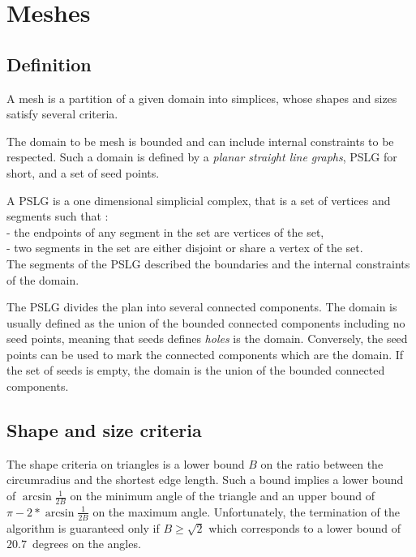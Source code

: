 
\section{Meshes}
\label{sec:Mesh_2_meshes}


\subsection{Definition}
\label{sec:Mesh_2_meshes_definition}

A mesh is a partition of a given domain into simplices, whose shapes
and sizes satisfy several criteria.

The domain to be mesh is bounded and can include internal constraints
to be respected.  Such a domain is defined by a \emph{planar straight
  line graphs}, PSLG for short, and a set of seed points.

A PSLG is a one dimensional simplicial complex, that
is a set of vertices and segments such that : \\
- the endpoints of any segment in the set are vertices of the set, \\
- two segments in the set are either disjoint or share a vertex of the 
set. \\
The segments of the PSLG described the boundaries and the internal
constraints of the domain.

The PSLG divides the plan into several connected components.  The domain is
usually defined as the union of the bounded connected components including
no seed points, meaning that seeds defines \emph{holes} is the domain.
Conversely, the seed points can be used to mark the connected components
which are  the domain.  If the set of seeds is empty,
the domain is the union of the bounded connected components.

\subsection{Shape and size criteria}
\label{sec:Mesh_2_criteria}

The shape criteria on triangles is a lower bound $B$ on the ratio
between the circumradius and the shortest edge length.  Such a bound
implies a lower bound of $\arcsin{\frac{1}{2B}}$ on the minimum angle
of the triangle and an upper bound of $\pi - 2* \arcsin{\frac{1}{2B}}$
on the maximum angle.  Unfortunately, the termination of the algorithm
is guaranteed only if $B \ge \sqrt{2}$ which corresponds to a lower
bound of $20.7$~degrees on the angles.

